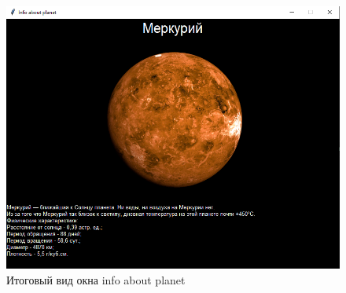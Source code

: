 \documentclass[11pt,a4paper]{report}
\begin{document}
\begin{figure}[h]
\centering
\includegraphics[width=0.75\linewidth]{1.png}
\caption{Итоговый вид окна info about planet}
\label{fig:mpr}
\end{figure}





\newpage
\end{document}
